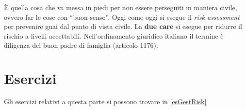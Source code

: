 È quella cosa che va messa in piedi per non essere perseguiti in maniera civile,
ovvero far le cose con ``buon senso''. Oggi come oggi si esegue il \textit{risk
assessment} per prevenire guai dal punto di vista civile. La \textbf{due care}
si esegue per ridurre il rischio a livelli accettabili. Nell'ordinamento
giuridico italiano il termine è diligenza del buon padre di famiglia (articolo
1176).


\section{Esercizi}

Gli esercizi relativi a questa parte si possono trovare in \ref{esGestRisk}

